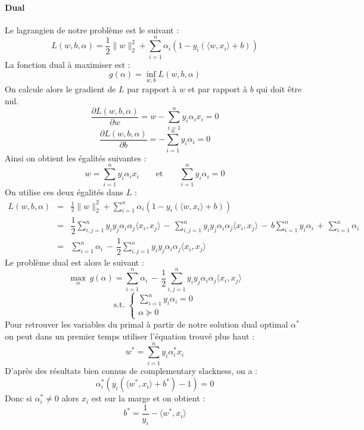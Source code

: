 \paragraph{Dual}
Le lagrangien de notre problème est le suivant :
$$ L(w, b, \alpha) = \dfrac{1}{2} \| w \|_2^2 + \sum_{i=1}^{n} \alpha_i \left( 1 - y_i \left( \langle w, x_i \rangle + b \right) \right) $$
La fonction dual à maximiser est :
$$ g(\alpha) = \inf_{w, b} L(w, b, \alpha) $$
On calcule alors le gradient de $L$ par rapport à $w$ et par rapport à $b$ qui doit être nul.
$$ \dfrac{\partial L(w, b, \alpha)}{\partial w} = w - \sum_{i = 1}^{n} y_i \alpha_i x_i = 0 $$
$$ \dfrac{\partial L(w, b, \alpha)}{\partial b} = - \sum_{i = 1}^{n} y_i \alpha_i = 0 $$
Ainsi on obtient les égalités suivantes :
$$ w = \sum_{i = 1}^{n} y_i \alpha_i x_i \qquad \text{et} \qquad \sum_{i = 1}^{n} y_i \alpha_i = 0 $$
On utilise ces deux égalités dans $L$ :
$$ \begin{array}{lll}
L(w, b, \alpha)
& = & \displaystyle \frac{1}{2} \| w \|_2^2 + \sum_{i=1}^{n} \alpha_i \left( 1 - y_i \left( \langle w, x_i \rangle + b \right) \right) \\
& = & \displaystyle \dfrac{1}{2} \sum_{i, j = 1}^n y_i y_j \alpha_i \alpha_j \langle x_i, x_j \rangle \, - \, \sum_{i, j = 1}^n y_i y_j \alpha_i \alpha_j \langle x_i, x_j \rangle \, - \, b \sum_{i = 1}^n y_i \alpha_i \, + \, \sum_{i=1}^{n} \alpha_i \\
& = & \displaystyle \sum_{i=1}^{n} \alpha_i \, - \, \dfrac{1}{2} \sum_{i, j = 1}^n y_i y_j \alpha_i \alpha_j \langle x_i, x_j \rangle
\end{array} $$
Le problème dual est alors le suivant :
$$ \max_\alpha \, g(\alpha) = \sum_{i=1}^{n} \alpha_i \, - \, \dfrac{1}{2} \sum_{i, j = 1}^n y_i y_j \alpha_i \alpha_j \langle x_i, x_j \rangle $$
\vspace{-3mm}
$$ \text{s.t. } \left\{ \begin{array}{l}
	\sum_{i=1}^{n} y_i \alpha_i = 0 \\
	\alpha \succeq 0
\end{array} \right. $$
Pour retrouver les variables du primal à partir de notre solution dual optimal $\alpha^*$ on peut dans un premier temps utiliser l'équation trouvé plus haut :
$$ w^* = \sum_{i = 1}^{n} y_i \alpha_i^* x_i $$
D'après des résultats bien connus de complementary slackness, on a :
$$ \alpha_i^* \left( y_i \left( \langle w^*, x_i \rangle + b^* \right) - 1 \right) = 0 $$
Donc si $\alpha_i^* \neq 0$ alors $x_i$ est sur la marge et on obtient :
$$ b^* = \dfrac{1}{y_i} - \langle w^*, x_i \rangle $$
